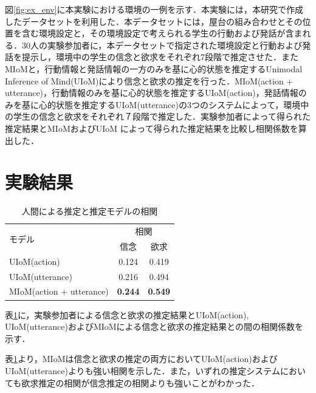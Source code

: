 \par
図\ref{fig:ex_env}に本実験における環境の一例を示す．本実験には，本研究で作成したデータセットを利用した．本データセットには，屋台の組み合わせとその位置を含む環境設定と，その環境設定で考えられる学生の行動および発話が含まれる．30人の実験参加者に，本データセットで指定された環境設定と行動および発話を提示し，環境中の学生の信念と欲求をそれぞれ7段階で推定させた．またMIoMと，行動情報と発話情報の一方のみを基に心的状態を推定するUnimodal Inference of Mind(UIoM)により信念と欲求の推定を行った．MIoM(action + utterance)，行動情報のみを基に心的状態を推定するUIoM(action)，発話情報のみを基に心的状態を推定するUIoM(utterance)の3つのシステムによって，環境中の学生の信念と欲求をそれぞれ７段階で推定した．実験参加者によって得られた推定結果とMIoMおよびUIoM によって得られた推定結果を比較し相関係数を算出した．


\section{実験結果}

\begin{table}[htb]
  \begin{center}
  \caption{人間による推定と推定モデルの相関}
  \label{tab:cof}
  \begin{tabular}{lcc} \hline
    \multirow{2}{*}{モデル}&\multicolumn{2}{c}{相関}\\\cline{2-3}
    & \hspace{10pt} 信念 \hspace{10pt} & \hspace{10pt} 欲求 \hspace{10pt} \\ \hline
    UIoM(action)&0.124&0.419\\
    UIoM(utterance)&0.216&0.494\\
    MIoM(action + utterance)&\bf0.244&\bf0.549 \\\hline
  \end{tabular}
\end{center}
\end{table}


\par
表\ref{tab:cof}に，実験参加者による信念と欲求の推定結果とUIoM(action), UIoM(utterance)およびMIoMによる信念と欲求の推定結果との間の相関係数を示す．

\par
表\ref{tab:cof}より，MIoMは信念と欲求の推定の両方においてUIoM(action)およびUIoM(utterance)よりも強い相関を示した．また，いずれの推定システムにおいても欲求推定の相関が信念推定の相関よりも強いことがわかった．
